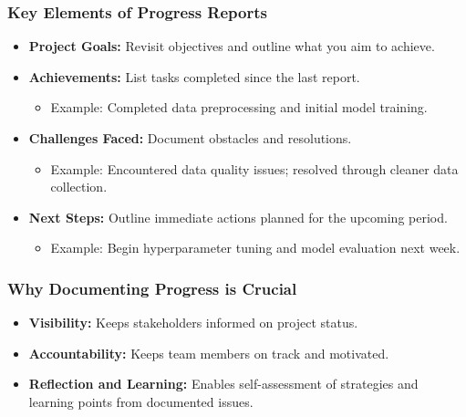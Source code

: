 \documentclass[aspectratio=169]{beamer}
\begin{document}
\begin{frame}[fragile]
    \frametitle{Key Elements of Progress Reports}
    \begin{itemize}
        \item \textbf{Project Goals:} Revisit objectives and outline what you aim to achieve.
        \item \textbf{Achievements:} List tasks completed since the last report. 
        \begin{itemize}
            \item Example: Completed data preprocessing and initial model training.
        \end{itemize}
        \item \textbf{Challenges Faced:} Document obstacles and resolutions. 
        \begin{itemize}
            \item Example: Encountered data quality issues; resolved through cleaner data collection.
        \end{itemize}
        \item \textbf{Next Steps:} Outline immediate actions planned for the upcoming period.
        \begin{itemize}
            \item Example: Begin hyperparameter tuning and model evaluation next week.
        \end{itemize}
    \end{itemize}
\end{frame}

\begin{frame}[fragile]
    \frametitle{Why Documenting Progress is Crucial}
    \begin{itemize}
        \item \textbf{Visibility:} Keeps stakeholders informed on project status.
        \item \textbf{Accountability:} Keeps team members on track and motivated.
        \item \textbf{Reflection and Learning:} Enables self-assessment of strategies and learning points from documented issues.
    \end{itemize}
\end{frame}
\end{document}
